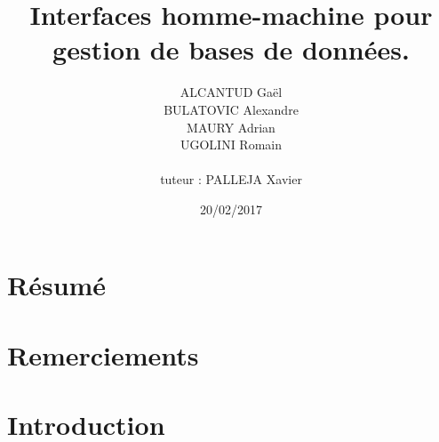 \documentclass[12pt, a4paper, twoside, openright]{book}
\title{Interfaces homme-machine pour gestion de bases de données.}
\author{ALCANTUD Gaël \\ BULATOVIC Alexandre \\ MAURY Adrian \\ UGOLINI Romain \\ \\tuteur : PALLEJA Xavier}
\date{20/02/2017}
\begin{document}
\frontmatter
\maketitle

\thispagestyle{empty}
\chapter*{Résumé}


\thispagestyle{empty}
\chapter*{Remerciements}


\tableofcontents
\listoffigures
\printglossaries

\mainmatter
\chapter*{Introduction}


\backmatter
\end{document}
